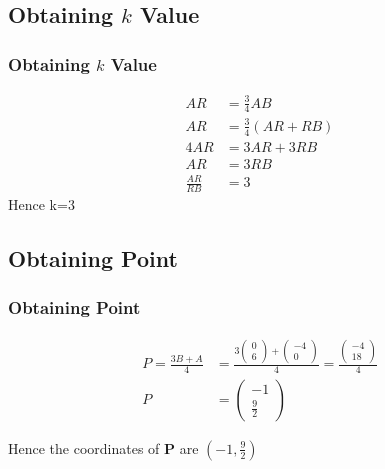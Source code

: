 \documentclass{beamer}
\providecommand{\brak}[1]{\ensuremath{\left(#1\right)}}
\theoremstyle{remark}
\newcommand{\myvec}[1]{\ensuremath{\begin{pmatrix}#1\end{pmatrix}}}
\let\vec\mathbf
\numberwithin{equation}{section}
\begin{document}
\subsection{Obtaining $k$ Value}
\begin{frame}
\frametitle{Obtaining $k$ Value}
\begin{align}
	AR&=\frac{3}{4}AB \\
    AR&=\frac{3}{4}(AR+RB) \\
    4AR&=3AR+3RB \\
    AR&=3RB\\
\frac{AR}{RB}&=3
\end{align}
Hence k=3
\end{frame}
\subsection{Obtaining Point}
\begin{frame}
\frametitle{Obtaining Point}

\begin{align}
P=\frac{3B+A}{4}&=\frac{3\myvec{0\\6}+\myvec{-4\\0}}{4}=\frac{\myvec{-4\\18}}{4} \\
P&=\myvec{-1\\\frac{9}{2}}
\end{align}

Hence the coordinates of $\vec{P}$ are $\brak{-1,\frac{9}{2}}$



\end{frame}
\end{document}
